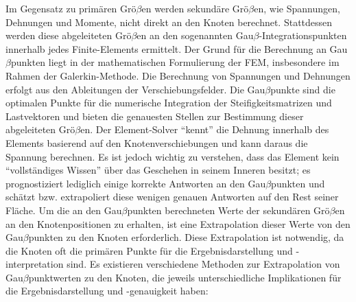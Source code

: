 Im Gegensatz zu primären Grö$\beta$en werden sekundäre Grö$\beta$en, wie Spannungen, Dehnungen und Momente, nicht direkt an den Knoten berechnet. Stattdessen werden diese abgeleiteten Grö$\beta$en an den sogenannten Gau$\beta$-Integrationspunkten innerhalb jedes Finite-Elements ermittelt.\newline
Der Grund für die Berechnung an Gau$\beta$punkten liegt in der mathematischen Formulierung der FEM, insbesondere im Rahmen der Galerkin-Methode. Die Berechnung von Spannungen und Dehnungen erfolgt aus den Ableitungen der Verschiebungsfelder. Die Gau$\beta$punkte sind die optimalen Punkte für die numerische Integration der Steifigkeitsmatrizen und Lastvektoren und bieten die genauesten Stellen zur Bestimmung dieser abgeleiteten Grö$\beta$en. Der Element-Solver ``kennt'' die Dehnung innerhalb des Elements basierend auf den Knotenverschiebungen und kann daraus die Spannung berechnen. Es ist jedoch wichtig zu verstehen, dass das Element kein ``vollständiges Wissen'' über das Geschehen in seinem Inneren besitzt; es prognostiziert lediglich einige korrekte Antworten an den Gau$\beta$punkten und schätzt bzw. extrapoliert diese wenigen genauen Antworten auf den Rest seiner Fläche.\newline
Um die an den Gau$\beta$punkten berechneten Werte der sekundären Grö$\beta$en an den Knotenpositionen zu erhalten, ist eine Extrapolation dieser Werte von den Gau$\beta$punkten zu den Knoten erforderlich. Diese Extrapolation ist notwendig, da die Knoten oft die primären Punkte für die Ergebnisdarstellung und -interpretation sind.\newline
Es existieren verschiedene Methoden zur Extrapolation von Gau$\beta$punktwerten zu den Knoten, die jeweils unterschiedliche Implikationen für die Ergebnisdarstellung und -genauigkeit haben:

